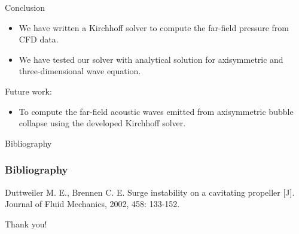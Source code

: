 \documentclass[10pt, aspectratio=169]{beamer}
\begin{document}
\begin{frame}{Conclusion}
	\begin{itemize}
		\item We have written a Kirchhoff solver to compute the far-field pressure from CFD data.
		\item We have tested our solver with analytical solution for axisymmetric and three-dimensional wave equation.
	\end{itemize}
	Future work:
	\begin{itemize}
		\item To compute the far-field acoustic waves emitted from axisymmetric bubble collapse
			  using the developed Kirchhoff solver. 
	\end{itemize}
\end{frame}

\begin{frame}[allowframebreaks]{Bibliography}
	\frametitle{Bibliography}
	
	\begin{thebibliography}{99}
		 Duttweiler M. E., Brennen C. E. Surge instability on a cavitating propeller [J]. Journal of Fluid Mechanics, 2002, 458: 133-152.
	\end{thebibliography}
\end{frame}

\begin{frame}[standout]
	Thank you!
\end{frame}
\end{document}
